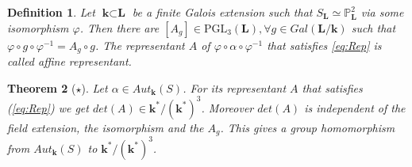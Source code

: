 \documentclass[12pt, oneside, reqno]{amsart}
\newtheorem{theorem}{Theorem}[section]
\newtheorem{definition}[theorem]{Definition}
\begin{document}
\begin{definition}
    Let $\textbf{k} \subset \textbf{L}$ be a finite Galois extension such that $S_{\textbf{L}} \simeq \mathbb{P}^2_{\textbf{L}}$ via some isomorphism $\varphi$. Then there are $[A_g] \in \mathrm{PGL}_3(\textbf{L}), \forall g \in Gal(\textbf{L}/\textbf{k})$ such that $\varphi \circ g \circ \varphi^{-1} = A_g \circ g$. The representant $A$ of $\varphi \circ \alpha \circ \varphi^{-1}$ that satisfies \ref{eq:Rep} is called affine representant.  
\end{definition}
\begin{theorem}[$\star$] \label{Determinant}
    Let $\alpha \in Aut_{\textbf{k}}(S)$. For its representant $A$ that satisfies (\ref{eq:Rep}) we get $det(A) \in \textbf{k}^*/(\textbf{k}^*)^3$. Moreover $det(A)$ is independent of the field extension, the isomorphism and the $A_g$. This gives a group homomorphism from $Aut_{\textbf{k}}(S)$ to $\textbf{k}^*/(\textbf{k}^*)^3$. 
\end{theorem}
\end{document}
